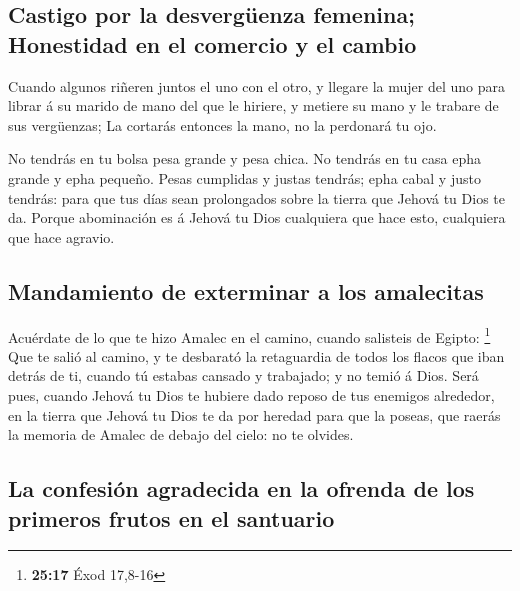 \hypertarget{castigo-por-la-desverguxfcenza-femenina-honestidad-en-el-comercio-y-el-cambio}{%
\subsection{Castigo por la desvergüenza femenina; Honestidad en el
comercio y el
cambio}\label{castigo-por-la-desverguxfcenza-femenina-honestidad-en-el-comercio-y-el-cambio}}

 Cuando algunos riñeren juntos el uno con el otro, y
llegare la mujer del uno para librar á su marido de mano del que le
hiriere, y metiere su mano y le trabare de sus vergüenzas; 
La cortarás entonces la mano, no la perdonará tu ojo.

 No tendrás en tu bolsa pesa grande y pesa chica.
 No tendrás en tu casa epha grande y epha pequeño.
 Pesas cumplidas y justas tendrás; epha cabal y justo
tendrás: para que tus días sean prolongados sobre la tierra que Jehová
tu Dios te da.  Porque abominación es á Jehová tu Dios
cualquiera que hace esto, cualquiera que hace agravio.

\hypertarget{mandamiento-de-exterminar-a-los-amalecitas}{%
\subsection{Mandamiento de exterminar a los
amalecitas}\label{mandamiento-de-exterminar-a-los-amalecitas}}

 Acuérdate de lo que te hizo Amalec en el camino, cuando
salisteis de Egipto: \footnote{\textbf{25:17} Éxod 17,8-16}
 Que te salió al camino, y te desbarató la retaguardia de
todos los flacos que iban detrás de ti, cuando tú estabas cansado y
trabajado; y no temió á Dios.  Será pues, cuando Jehová tu
Dios te hubiere dado reposo de tus enemigos alrededor, en la tierra que
Jehová tu Dios te da por heredad para que la poseas, que raerás la
memoria de Amalec de debajo del cielo: no te olvides.

\hypertarget{la-confesiuxf3n-agradecida-en-la-ofrenda-de-los-primeros-frutos-en-el-santuario}{%
\subsection{La confesión agradecida en la ofrenda de los primeros frutos
en el
santuario}\label{la-confesiuxf3n-agradecida-en-la-ofrenda-de-los-primeros-frutos-en-el-santuario}}

